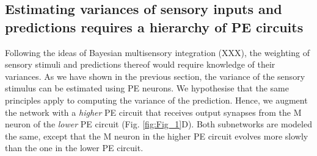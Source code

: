 \documentclass[10pt,a4paper]{article}
\begin{document}
\subsection*{Estimating variances of sensory inputs and predictions requires a hierarchy of PE circuits}
%
Following the ideas of Bayesian multisensory integration (XXX), the weighting of sensory stimuli and predictions thereof would require knowledge of their variances. As we have shown in the previous section, the variance of the sensory stimulus can be estimated using PE neurons. We hypothesise that the same principles apply to computing the variance of the prediction. Hence, we augment the network with a \textit{higher} PE circuit that receives output synapses from the M neuron of the \textit{lower} PE circuit (Fig. \ref{fig:Fig_1}D). Both subnetworks are modeled the same, except that the M neuron in the higher PE circuit evolves more slowly than the one in the lower PE circuit. 
%
\end{document}
